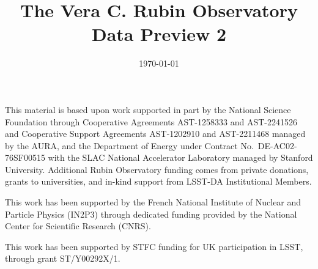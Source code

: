 \documentclass[twocolumn,twocolappendix,trackchanges, linenumbers]{aastex7}
\begin{document}
\date{\today}
\title{The Vera C. Rubin Observatory Data Preview 2}














%






\begin{acknowledgments}
This material is based upon work supported in part by the National Science Foundation through Cooperative Agreements AST-1258333 and AST-2241526 and Cooperative Support Agreements AST-1202910 and AST-2211468 managed by the \gls{AURA}, and the Department of Energy under Contract No.\ DE-AC02-76SF00515 with the SLAC National Accelerator Laboratory managed by Stanford University.
Additional Rubin Observatory funding comes from private donations, grants to universities, and in-kind support from LSST-DA Institutional Members.

This work has been supported by the French National Institute of Nuclear and Particle Physics (IN2P3) through dedicated funding provided by the National Center for Scientific Research (CNRS).

This work has been supported by STFC funding for UK participation in LSST, through grant ST/Y00292X/1.
\end{acknowledgments}
\vspace{5mm}

\end{document}
